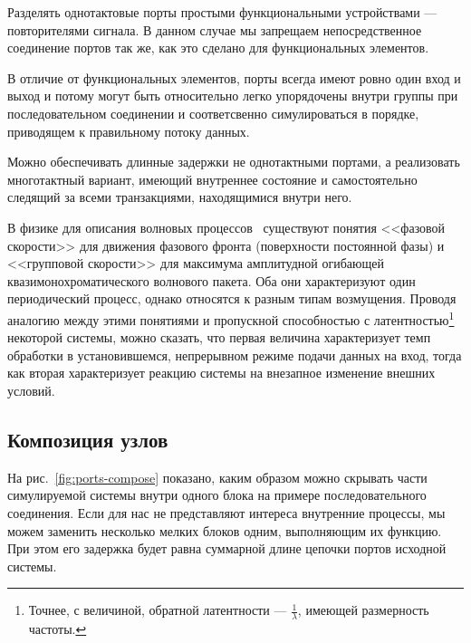 \begin{enumerate*}
    \item Разделять однотактовые порты простыми функциональными устройствами --- повторителями сигнала. В данном случае мы запрещаем непосредственное соединение портов так же, как это сделано для функциональных элементов.
    \item В отличие от функциональных элементов, порты всегда имеют ровно один вход и выход и потому могут быть относительно легко упорядочены внутри группы при последовательном соединении и соответсвенно симулироваться в порядке, приводящем к правильному потоку данных.
    \item Можно обеспечивать длинные задержки не однотактными портами, а реализовать многотактный вариант, имеющий внутреннее состояние и самостоятельно следящий за всеми транзакциями, находящимися внутри него.
\end{enumerate*}

\begin{digression}%

В физике для описания волновых процессов~\cite{sivukhin-vol5} существуют понятия <<фазовой скорости>> для движения фазового фронта (поверхности постоянной фазы) и <<групповой скорости>> для максимума амплитудной огибающей квазимонохроматического волнового пакета. Оба они характеризуют один периодический процесс, однако относятся к разным типам возмущения. Проводя аналогию между этими понятиями и пропускной способностью с латентностью\footnote{Точнее, с величиной, обратной латентности --- $\frac{1}{\lambda}$, имеющей размерность частоты.} некоторой системы, можно сказать, что первая величина характеризует темп обработки в установившемся, непрерывном режиме подачи данных на вход, тогда как вторая характеризует реакцию системы на внезапное изменение внешних условий.
\end{digression}


\subsection{Композиция узлов}

На рис.~\ref{fig:ports-compose} показано, каким образом можно скрывать части симулируемой системы внутри одного блока на примере последовательного соединения. Если для нас не представляют интереса внутренние процессы, мы можем заменить несколько мелких блоков одним, выполняющим их функцию. При этом его задержка будет равна суммарной длине цепочки портов исходной системы.

